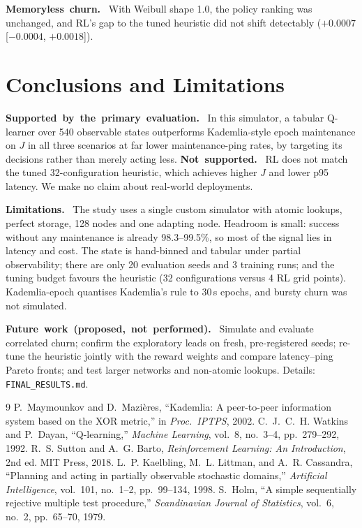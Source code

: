 \documentclass[9pt,twocolumn]{extarticle}
\newcommand{\inl}[1]{\mbox{\textbf{#1.}}\ }
\begin{document}
\inl{Memoryless churn} With Weibull shape 1.0, the policy ranking was unchanged, and RL's gap to the tuned heuristic did not shift detectably ($+0.0007$ [$-0.0004$, $+0.0018$]).

\section{Conclusions and Limitations}
\inl{Supported by the primary evaluation} In this simulator, a tabular Q-learner over 540 observable states outperforms Kademlia-style epoch maintenance on $J$ in all three scenarios at far lower maintenance-ping rates, by targeting its decisions rather than merely acting less. \inl{Not supported} RL does not match the tuned 32-configuration heuristic, which achieves higher $J$ and lower p95 latency. We make no claim about real-world deployments.

\inl{Limitations} The study uses a single custom simulator with atomic lookups, perfect storage, 128 nodes and one adapting node. Headroom is small: success without any maintenance is already 98.3--99.5\%, so most of the signal lies in latency and cost. The state is hand-binned and tabular under partial observability; there are only 20 evaluation seeds and 3 training runs; and the tuning budget favours the heuristic (32 configurations versus 4 RL grid points). Kademlia-epoch quantises Kademlia's rule to 30\,s epochs, and bursty churn was not simulated.

\inl{Future work (proposed, not performed)} Simulate and evaluate correlated churn; confirm the exploratory leads on fresh, pre-registered seeds; re-tune the heuristic jointly with the reward weights and compare latency--ping Pareto fronts; and test larger networks and non-atomic lookups. Details: \texttt{FINAL\_RESULTS.md}.


\begin{thebibliography}{9}\footnotesize
\setlength{\itemsep}{1pt}
 P.~Maymounkov and D.~Mazi\`eres, ``Kademlia: A peer-to-peer information system based on the XOR metric,'' in \emph{Proc.\ IPTPS}, 2002.
 C.~J.~C.~H. Watkins and P.~Dayan, ``Q-learning,'' \emph{Machine Learning}, vol.~8, no.~3--4, pp.~279--292, 1992.
 R.~S. Sutton and A.~G. Barto, \emph{Reinforcement Learning: An Introduction}, 2nd ed. MIT Press, 2018.
 L.~P. Kaelbling, M.~L. Littman, and A.~R. Cassandra, ``Planning and acting in partially observable stochastic domains,'' \emph{Artificial Intelligence}, vol.~101, no.~1--2, pp.~99--134, 1998.
 S.~Holm, ``A simple sequentially rejective multiple test procedure,'' \emph{Scandinavian Journal of Statistics}, vol.~6, no.~2, pp.~65--70, 1979.
\end{thebibliography}
\end{document}
